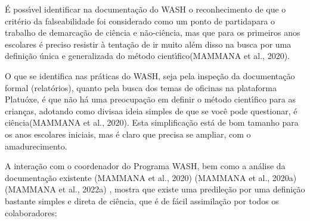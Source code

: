\documentclass[
12pt,		%
openright,	%
twoside,  %
a4paper,			%
chapter=TITLE,		%
english,			%
french,				%
spanish,			%
brazil				%
]{USPSC-classe/USPSC}
\begin{document}
\noindent\begin{center}\mbox{\centering{}}\end{center}


\'E poss\'{\i}vel identificar na documenta\c{c}\~ao do WASH o reconhecimento de que o crit\'erio da falseabilidade foi considerado como um \textquotedbl ponto de partida\textquotedbl  para o trabalho de \textquotedbl demarca\c{c}\~ao de ci\^encia e n\~ao-ci\^encia\textquotedbl , mas que para \textquotedbl os primeiros anos escolares \'e preciso resistir \`a tenta\c{c}\~ao de ir muito al\'em disso na busca por uma defini\c{c}\~ao \'unica e generalizada do m\'etodo cient\'{\i}fico\textquotedbl   (MAMMANA et al., 2020).









O que se identifica nas pr\'aticas do WASH, seja pela inspe\c{c}\~ao da documenta\c{c}\~ao formal (relat\'orios), quanto pela busca dos temas de oficinas na plataforma \textquotedbl Platu\'oxe\textquotedbl , \'e que n\~ao h\'a uma preocupa\c{c}\~ao em definir o m\'etodo cient\'{\i}fico para as crian\c{c}as, adotando como \textquotedbl divisa\textquotedbl  a ideia simples de que \textquotedbl se voc\^e pode questionar, \'e ci\^encia\textquotedbl   (MAMMANA et al., 2020). Esta simplifica\c{c}\~ao est\'a de bom tamanho para os anos escolares iniciais, mas \'e claro que precisa se ampliar, com o amadurecimento.









A intera\c{c}\~ao com o coordenador do Programa WASH, bem como a an\'alise da documenta\c{c}\~ao existente  (MAMMANA et al., 2020)  (MAMMANA et al., 2020a)  (MAMMANA et al., 2022a) , mostra que existe uma predile\c{c}\~ao por uma defini\c{c}\~ao bastante simples e direta de ci\^encia, que \'e de f\'acil assimila\c{c}\~ao por todos os colaboradores:
\end{document}
